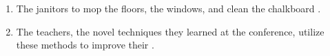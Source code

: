 \begin{enumerate}
\item \begin{inparaenum}[A]
The janitors   to mop the floors,  the windows, and clean the chalkboard . 
\end{inparaenum}

\item \begin{inparaenum}[A]
The teachers,  the novel  techniques they learned at the conference,  utilize these methods to improve their .  
\end{inparaenum}

\end{enumerate}
